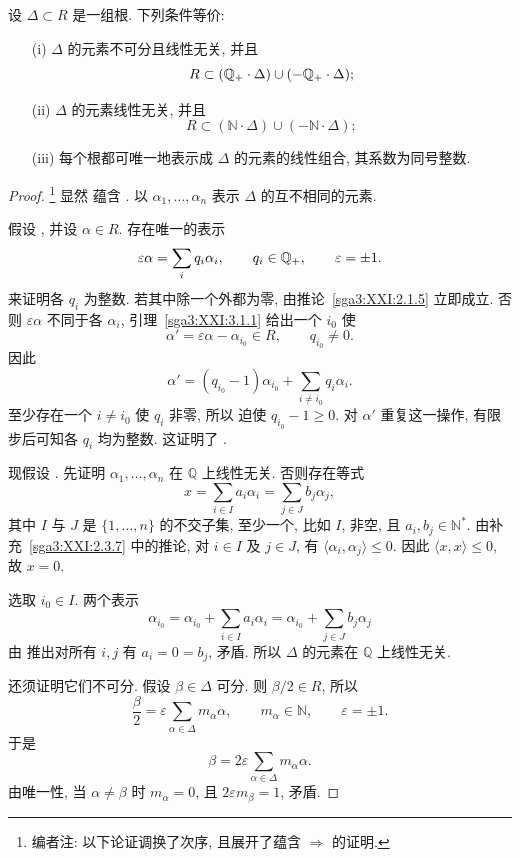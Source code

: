 \begin{proposition}\label{sga3:XXI:3.1.5}
设 \(\Delta\subset R\) 是一组根. 下列条件等价:
\begin{enumerate}
\item[\SGAInlineRefTarget{sga3:XXI:3.1.5:item:i}(i)] \(\Delta\) 的元素不可分且线性无关, 并且
  \[
   R\subset(\mathbb{Q}_{+}\cdot\Delta)\cup(-\mathbb{Q}_{+}\cdot\Delta);
  \]
\item[\SGAInlineRefTarget{sga3:XXI:3.1.5:item:ii}(ii)] \(\Delta\) 的元素线性无关, 并且
  \[
   R\subset(\mathbb N\cdot\Delta)\cup(-\mathbb N\cdot\Delta);
  \]
\item[\SGAInlineRefTarget{sga3:XXI:2.3.7:corollary:item:iii}(iii)] 每个根都可唯一地表示成 \(\Delta\) 的元素的线性组合, 其系数为同号整数.
\end{enumerate}
\end{proposition}
\begin{proof}
\footnote{编者注: 以下论证调换了次序, 且展开了蕴含 \(\Rightarrow\) 的证明.}
显然  蕴含 . 以 \(\alpha_1,\ldots,\alpha_n\) 表示 \(\Delta\) 的互不相同的元素.

假设 , 并设 \(\alpha\in R\). 存在唯一的表示
\[
 \varepsilon\alpha=\sum_i q_i\alpha_i,
 \qquad q_i\in\mathbb{Q}_{+},\qquad\varepsilon=\pm1.
\]
来证明各 \(q_i\) 为整数. 若其中除一个外都为零, 由推论~\ref{sga3:XXI:2.1.5} 立即成立. 否则 \(\varepsilon\alpha\) 不同于各 \(\alpha_i\), 引理~\ref{sga3:XXI:3.1.1} 给出一个 \(i_0\) 使
\[
 \alpha'=\varepsilon\alpha-\alpha_{i_0}\in R,
 \qquad q_{i_0}\neq0.
\]
因此
\[
 \alpha'
 =(q_{i_0}-1)\alpha_{i_0}
  +\sum_{i\neq i_0}q_i\alpha_i.
\]
至少存在一个 \(i\neq i_0\) 使 \(q_i\) 非零, 所以  迫使 \(q_{i_0}-1\geq0\). 对 \(\alpha'\) 重复这一操作, 有限步后可知各 \(q_i\) 均为整数. 这证明了 .

现假设 . 先证明 \(\alpha_1,\ldots,\alpha_n\) 在 \(\mathbb Q\) 上线性无关. 否则存在等式
\[
 x=\sum_{i\in I}a_i\alpha_i
  =\sum_{j\in J}b_j\alpha_j,
\]
其中 \(I\) 与 \(J\) 是 \(\{1,\ldots,n\}\) 的不交子集, 至少一个, 比如 \(I\), 非空, 且 \(a_i,b_j\in\mathbb N^\ast\). 由补充~\ref{sga3:XXI:2.3.7} 中的推论, 对 \(i\in I\) 及 \(j\in J\), 有 \(\langle\alpha_i,\alpha_j\rangle\leq0\). 因此 \(\langle x,x\rangle\leq0\), 故 \(x=0\).

选取 \(i_0\in I\). 两个表示
\[
 \alpha_{i_0}
 =\alpha_{i_0}+\sum_{i\in I}a_i\alpha_i
 =\alpha_{i_0}+\sum_{j\in J}b_j\alpha_j
\]
由  推出对所有 \(i,j\) 有 \(a_i=0=b_j\), 矛盾. 所以 \(\Delta\) 的元素在 \(\mathbb Q\) 上线性无关.

还须证明它们不可分. 假设 \(\beta\in\Delta\) 可分. 则 \(\beta/2\in R\), 所以
\[
 \frac{\beta}{2}
 =\varepsilon\sum_{\alpha\in\Delta}m_\alpha\alpha,
 \qquad m_\alpha\in\mathbb N,\qquad\varepsilon=\pm1.
\]
于是
\[
 \beta=2\varepsilon\sum_{\alpha\in\Delta}m_\alpha\alpha.
\]
由唯一性, 当 \(\alpha\neq\beta\) 时 \(m_\alpha=0\), 且 \(2\varepsilon m_\beta=1\), 矛盾.
\end{proof}

